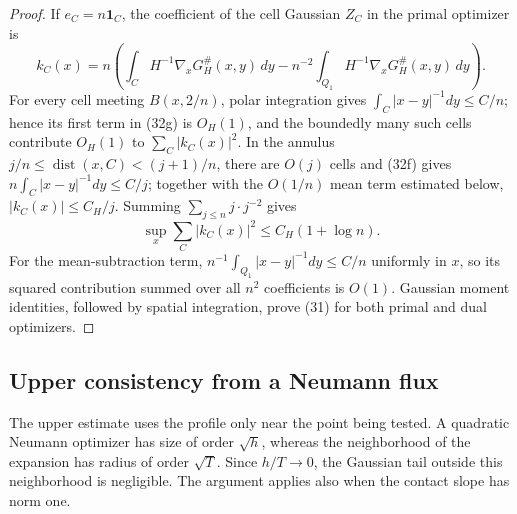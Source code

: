 \documentclass{aomart}
\theoremstyle{definition}
\newcommand{\1}{\mathbf 1}
\begin{document}
\begin{proof}
If $e_ C=n\mathbf1_ C$, the coefficient of the cell Gaussian $Z_ C$
in the primal optimizer is
\begin{equation}
k_ C(x)=n\left(\int_ C H^{-1}\nabla_ xG_ H^\#(x,y)\,dy
-n^{-2}\int_ {Q_ 1}H^{-1}\nabla_ xG_ H^\#(x,y)\,dy\right).
\tag{32g}
\end{equation}
For every cell meeting $B(x,2/n)$, polar integration gives
$\int_ C|x-y|^{-1}dy\leq C/n$; hence its first term in (32g) is
$O_ H(1)$, and the boundedly many such cells contribute $O_ H(1)$ to
$\sum_ C|k_ C(x)|^2$.  In the annulus
$j/n\leq\operatorname {dist}(x,C)<(j+1)/n$, there are $O(j)$
cells and (32f) gives
$n\int_ C|x-y|^{-1}dy\leq C/j$; together with the $O(1/n)$
mean term estimated below, $|k_ C(x)|\leq C_ H/j$.  Summing
$\sum_ {j\leq n}j\cdot j^{-2}$ gives
\begin{equation}
\sup_ x\sum_ C|k_ C(x)|^2\leq C_ H(1+\log n).
\tag{32h}
\end{equation}
For the mean-subtraction term,
$n^{-1}\int_ {Q_ 1}|x-y|^{-1}dy\leq C/n$ uniformly in $x$, so its
squared contribution summed over all $n^2$ coefficients is $O(1)$.
Gaussian moment identities, followed by spatial integration, prove
(31) for both primal and dual optimizers.

\end{proof}

\subsection{Upper consistency from a Neumann flux}

The upper estimate uses the profile only near the point being tested.
A quadratic Neumann optimizer has size of order $\sqrt h$, whereas
the neighborhood of the expansion has radius of order $\sqrt T$.
Since $h/T\to0$, the Gaussian tail outside this neighborhood is
negligible.  The argument applies also when the contact slope has
norm one.
\end{document}
